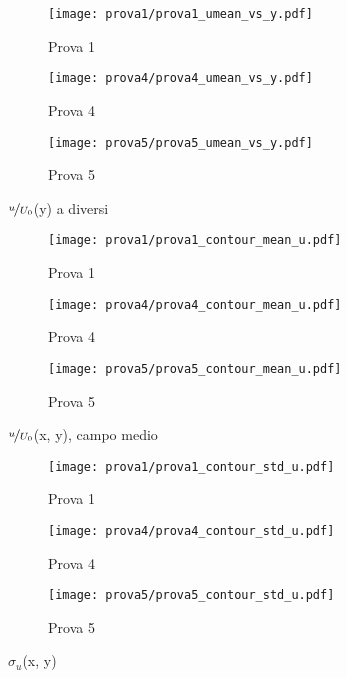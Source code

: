 \documentclass{article} %
\newcommand{\xd}{\nicefrac{\textrm{x}}{\textrm{D}}\ }
\begin{document}
\begin{figure}[b!]
	\centering
	\begin{subfigure}{0.3\textwidth}
		\texttt{[image: prova1/prova1\_umean\_vs\_y.pdf]}
		\label{fig:y_Unorm_1}
		\caption{Prova 1}
	\end{subfigure}
	\begin{subfigure}{0.3\textwidth}
		\texttt{[image: prova4/prova4\_umean\_vs\_y.pdf]}
		\label{fig:y_Unorm_4}
		\caption{Prova 4}
	\end{subfigure}  
	\begin{subfigure}{0.3\textwidth}
		\texttt{[image: prova5/prova5\_umean\_vs\_y.pdf]}
		\label{fig:y_Unorm_5}
		\caption{Prova 5}
	\end{subfigure}  
	\caption{$\nicefrac{u}{U_0}$(y) a diversi \xd}
	\label{fig:y_Unorm_145}
\end{figure}
\clearpage
\begin{figure}[h!]
	\centering
	\begin{subfigure}{0.3\textwidth}
		\texttt{[image: prova1/prova1\_contour\_mean\_u.pdf]}
		\label{fig:MEAN_U_1}
		\caption{Prova 1}
	\end{subfigure}
	\begin{subfigure}{0.3\textwidth}
		\texttt{[image: prova4/prova4\_contour\_mean\_u.pdf]}
		\label{fig:MEAN_U_2}
		\caption{Prova 4}
	\end{subfigure}  
	\begin{subfigure}{0.3\textwidth}
		\texttt{[image: prova5/prova5\_contour\_mean\_u.pdf]}
		\label{fig:MEAN_U_3}
		\caption{Prova 5}
	\end{subfigure}  
      \caption{$\nicefrac{u}{U_0}$(x, y), campo medio}
      \label{fig:MEAN_U_145}
\end{figure}
\begin{figure}[h!]
	\centering
	\begin{subfigure}{0.3\textwidth}
		\texttt{[image: prova1/prova1\_contour\_std\_u.pdf]}
		\caption{Prova 1}
		\label{fig:STD_U_1}
	\end{subfigure} 
	\begin{subfigure}{0.3\textwidth}
		\texttt{[image: prova4/prova4\_contour\_std\_u.pdf]}
		\caption{Prova 4}
		\label{fig:STD_U_4}
	\end{subfigure}  
	\begin{subfigure}{0.3\textwidth}
		\texttt{[image: prova5/prova5\_contour\_std\_u.pdf]}
		\caption{Prova 5}
		\label{fig:STD_U_5}
	\end{subfigure}
      \caption{$\sigma_u$(x, y)}
      \label{fig:STD_U_145}
\end{figure}\par
\clearpage
\end{document}
